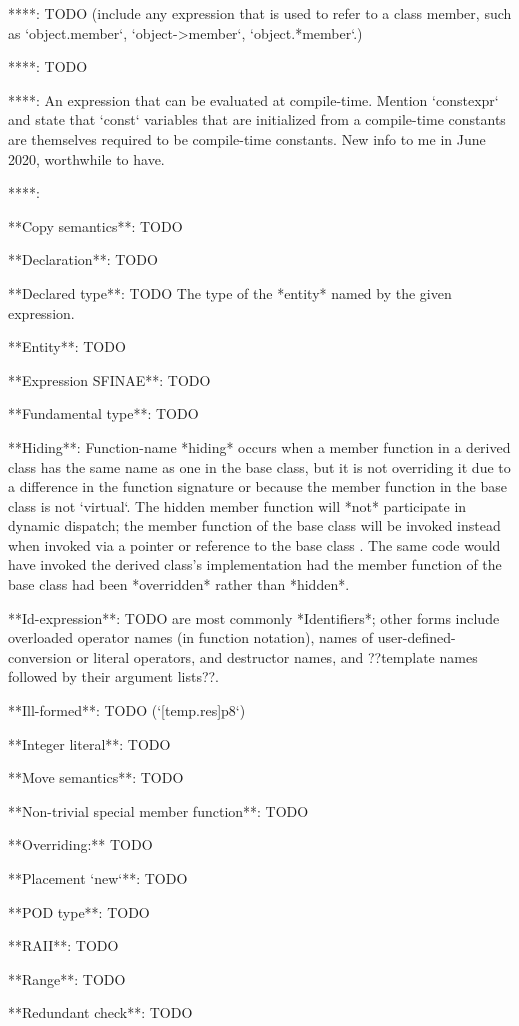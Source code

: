 ****: TODO (include any expression that is used to refer to a class member, such as `object.member`, `object->member`, `object.*member`.)

****: TODO

****: An expression that can be evaluated at compile-time.  Mention `constexpr` and state that `const` variables that are initialized from a compile-time constants are themselves required to be compile-time constants.  New info to me in June 2020, worthwhile to have.

****: 

**Copy semantics**: TODO

**Declaration**: TODO

**Declared type**: TODO The type of the *entity* named by the given expression.

**Entity**: TODO

**Expression SFINAE**: TODO

**Fundamental type**: TODO

**Hiding**: Function-name *hiding* occurs when a member function in a derived class has the same name as one in the base class, but it is not overriding it due to a difference in the function signature or because the member function in the base class is not `virtual`. The hidden member function will *not* participate in dynamic dispatch; the member function of the base class will be invoked instead when invoked via a pointer or reference to the base class . The same code would have invoked the derived class's implementation had the member function of the base class had been *overridden* rather than *hidden*.

**Id-expression**: TODO are most commonly *Identifiers*; other forms include overloaded operator names (in function notation), names of user-defined-conversion or literal operators, and destructor names, and ??template names followed by their argument lists??.

**Ill-formed**: TODO (`[temp.res]p8`)

**Integer literal**: TODO

**Move semantics**: TODO

**Non-trivial special member function**: TODO

**Overriding:** TODO

**Placement `new`**: TODO

**POD type**: TODO

**RAII**: TODO

**Range**: TODO

**Redundant check**: TODO

